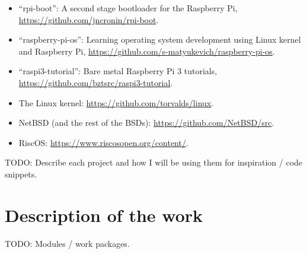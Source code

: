\documentclass{article}
\begin{document}
\begin{itemize}
    \item ``rpi-boot'': A second stage bootloader for the Raspberry Pi,
        \url{https://github.com/jncronin/rpi-boot}.
    \item ``raspberry-pi-os'': Learning operating system development using
        Linux kernel and Raspberry Pi,
        \url{https://github.com/s-matyukevich/raspberry-pi-os}.
    \item ``raspi3-tutorial'': Bare metal Raspberry Pi 3 tutorials,
        \url{https://github.com/bztsrc/raspi3-tutorial}.
    \item The Linux kernel: \url{https://github.com/torvalds/linux}.
    \item NetBSD (and the rest of the BSDs):
        \url{https://github.com/NetBSD/src}.
    \item RiscOS: \url{https://www.riscosopen.org/content/}.
\end{itemize}

TODO: Describe each project and how I will be using them for inspiration / code
snippets.


\section{Description of the work}
TODO: Modules / work packages.

\end{document}
